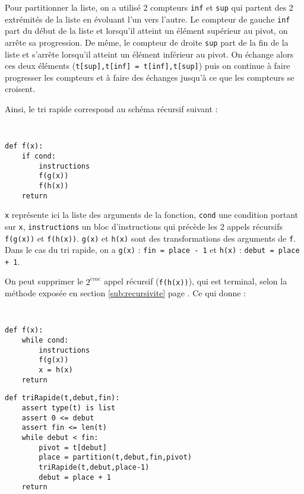 \vspace*{2mm}

\noindent Pour partitionner la liste, on a utilisé 2 compteurs {\tt inf} et {\tt sup} qui partent des
2 extrémités de la liste en évoluant l'un vers l'autre.
Le compteur de gauche {\tt inf} part du début de la liste et lorsqu'il atteint un élément 
supérieur au pivot, on arrête sa progression. De même, le compteur de droite {\tt sup}
part de la fin de la liste et s'arrête lorsqu'il atteint un élément inférieur au pivot.
On échange alors ces deux éléments ({\tt t[sup],t[inf] = t[inf],t[sup]}) puis on continue
à faire progresser les compteurs et à faire des échanges jusqu'à ce que les compteurs se
croisent.

\noindent Ainsi, le tri rapide correspond au schéma récursif suivant :

\noindent\mbox{}\hspace*{1cm}\begin{py}{4cm}\tt
\begin{verbatim}
def f(x):
    if cond:
        instructions
        f(g(x))
        f(h(x))
    return
\end{verbatim}
\end{py}
\hfill
\begin{py}{11cm}
{\tt x} représente ici la liste des arguments de la fonction,
{\tt cond} une condition portant sur {\tt x}, 
{\tt instructions} un bloc d'instructions qui précède les 2 appels
récursifs {\tt f(g(x))} et  {\tt f(h(x))}.
{\tt g(x)} et {\tt h(x)} sont des transformations des arguments de {\tt f}.
Dans le cas du tri rapide, on a {\tt g(x)} : {\tt fin = place - 1} et
{\tt h(x)} : {\tt debut = place + 1}.
\end{py}

\vspace*{2mm}

\noindent On peut supprimer le $2^{\grave eme}$ appel récursif ({\tt f(h(x))}), 
qui est terminal, selon la méthode exposée en section \ref{sub:recursivite} 
page \pageref{methode:recursivite}. Ce qui donne :

\noindent\mbox{}\hspace*{1cm}\begin{py}{4cm}\tt
\begin{verbatim}
def f(x):
    while cond:
        instructions
        f(g(x))
        x = h(x)
    return
\end{verbatim}
\end{py}
\hfill
\begin{py}{11cm}
\begin{verbatim}
def triRapide(t,debut,fin):
    assert type(t) is list
    assert 0 <= debut 
    assert fin <= len(t)
    while debut < fin:
        pivot = t[debut]
        place = partition(t,debut,fin,pivot)
        triRapide(t,debut,place-1)
        debut = place + 1
    return
\end{verbatim}
\end{py}


